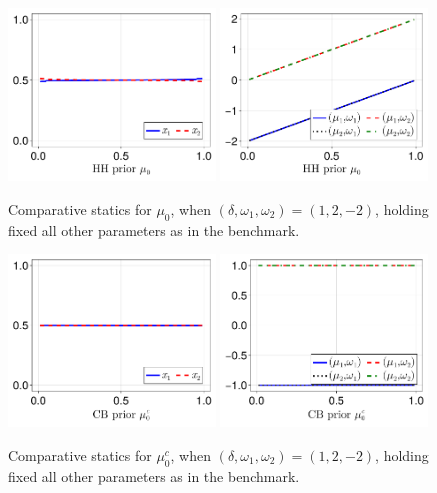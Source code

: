 \documentclass[12pt,a4paper]{article}
\begin{document}
\begin{figure}[H]
\centering
\includegraphics[width=0.49\textwidth]{figures/V8/γ_1/fig_optimal_π_across_μ_0_ω_1_2_ω_2_-2_δ_1.0_.pdf}
\includegraphics[width=0.49\textwidth]{figures/V8/γ_1/fig_posterior_across_μ_0_ω_1_2_ω_2_-2_δ_1.0_.pdf}
\caption{Comparative statics for $\mu_0$, when $(\delta,\omega_1,\omega_2)=(1,2,-2)$, holding fixed all other parameters as in the benchmark.}
\label{FigureA29}
\end{figure}

\begin{figure}[H]
\centering
\includegraphics[width=0.49\textwidth]{figures/V8/γ_1/fig_optimal_π_across_μ_0_c_ω_1_2_ω_2_-2_δ_1.0_.pdf}
\includegraphics[width=0.49\textwidth]{figures/V8/γ_1/fig_posterior_across_μ_0_c_ω_1_2_ω_2_-2_δ_1.0_.pdf}
\caption{Comparative statics for $\mu_0^c$, when $(\delta,\omega_1,\omega_2)=(1,2,-2)$, holding fixed all other parameters as in the benchmark.}
\label{FigureA30}
\end{figure}
\end{document}
